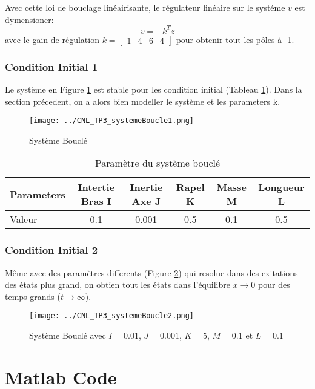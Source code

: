 \documentclass[a4paper,11pt]{article}
\begin{document}
Avec cette loi de bouclage lin\'eairisante, le r\'egulateur lin\'eaire sur le syst\'eme $v$ est dymensioner:
\begin{equation}
  v = -k^T z
\end{equation}
avec le gain de r\'egulation $k = \begin{bmatrix} 1 & 4 & 6 & 4 \end{bmatrix}$ pour obtenir tout les p\^oles \`a -1.
\subsubsection{Condition Initial 1}
Le syst\`eme en Figure \ref{fig:systemeBoulce1} est stable pour les condition initial (Tableau \ref{tab:systemBoucle1}). Dans la section pr\'ecedent, on a alors bien modeller le syst\`eme et les parameters k.
\begin{figure}[H]
\centering
\texttt{[image: ../CNL\_TP3\_systemeBoucle1.png]}
\caption{Syst\`eme Boucl\'e}
\label{fig:systemeBoulce1}
\end{figure}

\begin{table}[H]
  \centering
  \begin{tabular}{l|c|c|c|c|c}
    Parameters & Intertie Bras I & Inertie Axe J &  Rapel K & Masse M & Longueur L  \\     \hline
    Valeur & 0.1 & 0.001 & 0.5 & 0.1 & 0.5
  \end{tabular}
  \caption{Param\`etre du syst\`eme boucl\'e}
  \label{tab:systemBoucle1}
\end{table}

\subsubsection{Condition Initial 2}
M\^eme avec des param\`etres differents (Figure \ref{fig:systemeBoulce2}) qui resolue dans des exitations des \'etats plus grand, on obtien tout les \'etats dans l'\'equilibre $x \to 0$ pour des temps grands ($t \to \infty$).
\begin{figure}[H]
\centering
\texttt{[image: ../CNL\_TP3\_systemeBoucle2.png]}
\caption{Syst\`eme Boucl\'e avec $I = 0.01$, $J=0.001$, $K = 5$, $M=0.1$ et $L=0.1$ }
\label{fig:systemeBoulce2}
\end{figure}




\newpage
\clearpage
\appendix
\maketitle
\section{Matlab Code}
\begin{adjustwidth}{-0.6cm}{0.6cm}

\end{adjustwidth}
\end{document}
